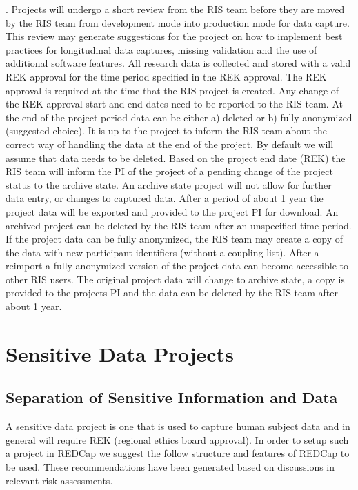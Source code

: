 \documentclass[letterpaper,10pt,english]{sphinxmanual}
\begin{document}
. Projects will undergo a short review from the RIS team before they are moved by the RIS team from development mode into production mode for data capture. This review may generate suggestions for the project on how to implement best practices for longitudinal data captures, missing validation and the use of additional software features. All research data is collected and stored with a valid REK approval for the time period specified in the REK approval. The REK approval is required at the time that the RIS project is created. Any change of the REK approval start and end dates need to be
reported to the RIS team. At the end of the project period data can be either a) deleted or b) fully anonymized (suggested choice). It is up to the project to inform the RIS team about the correct way of handling the data at the end of the project. By default we will assume that data needs to be deleted. Based on the project end date (REK) the RIS team will inform the PI of the project of a pending change of the project status to the archive state. An archive state project will not allow for further data entry, or changes to captured data. After a period of about 1 year the project data will be exported and provided to the project PI for download. An archived project can be deleted by the RIS team after an unspecified time period. If the project data can be fully anonymized, the RIS team may create a copy of the data with new participant identifiers (without a coupling list). After a re\sphinxhyphen{}import a fully anonymized version of the project data can become accessible to other RIS users. The original project
data will change to archive state, a copy is provided to the projects PI and the data can be deleted by the RIS team after about 1 year.


\section{Sensitive Data Projects}
\label{\detokenize{EndUser/index:sensitive-data-projects}}

\subsection{Separation of Sensitive Information and Data}
\label{\detokenize{EndUser/index:separation-of-sensitive-information-and-data}}
\sphinxAtStartPar
A sensitive data project is one that is used to capture human subject data and in general will require  REK (regional ethics board approval). In order to setup such a project in REDCap we suggest the follow structure and features of REDCap to be used. These recommendations have been generated based
on discussions in relevant risk assessments.
\end{document}
